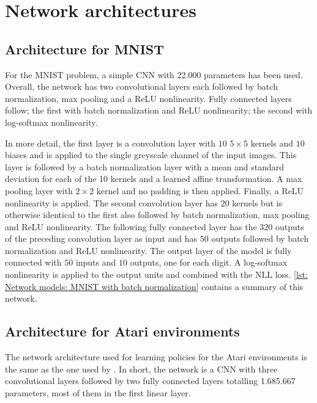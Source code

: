 
\section{Network architectures}\label{sec: Experimental work: Neural network architectures}


\subsection{Architecture for MNIST}\label{sec: Experimental work: Neural network architectures (MNIST)}
For the \gls{MNIST} problem, a simple \gls{CNN} with 22.000 parameters has been used. Overall, the network has two convolutional layers each followed by batch normalization, max pooling and a ReLU nonlinearity. Fully connected layers follow; the first with batch normalization and ReLU nonlinearity; the second with log-softmax nonlinearity.

In more detail, the first layer is a convolution layer with $10$ $5\times5$ kernels and $10$ biases and is applied to the single greyscale channel of the input images. This layer is followed by a batch normalization layer with a mean and standard deviation for each of the 10 kernels and a learned affine transformation. A max pooling layer with $2\times2$ kernel and no padding is then applied. Finally, a ReLU nonlinearity is applied. The second convolution layer has $20$ kernels but is otherwise identical to the first also followed by batch normalization, max pooling and ReLU nonlinearity. The following fully connected layer has the $320$ outputs of the preceding convolution layer as input and has $50$ outputs followed by batch normalization and ReLU nonlinearity. The output layer of the model is fully connected with $50$ inputs and $10$ outputs, one for each digit. A log-softmax nonlinearity is applied to the output units and combined with the \gls{NLL} loss. \autoref{lst: Network models: MNIST with batch normalization} contains a summary of this network.


\subsection{Architecture for Atari environments}\label{sec: Experimental work: Neural network architectures (RL}
The network architecture used for learning policies for the Atari environments is the same as the one used by \cite{Mnih2015, Silver2016}. In short, the network is a \gls{CNN} with three convolutional layers followed by two fully connected layers totalling 1.685.667 parameters, most of them in the first linear layer.


